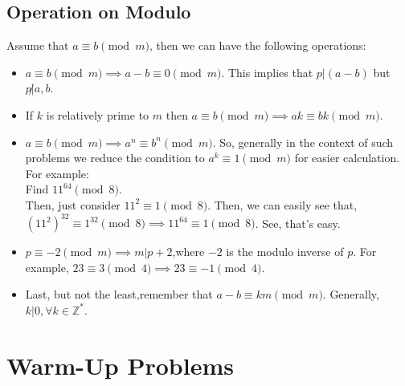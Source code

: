 \documentclass[a4paper,oneside,12 pt]{book}
\theoremstyle{definition}
\theoremstyle{definition}
\theoremstyle{definition}
\begin{document}
\subsection{Operation on Modulo}
Assume that $a \equiv b \pmod{m}$, then we can have the following operations:
\begin{itemize}
\item $a \equiv b \pmod{m} \implies a-b \equiv 0 \pmod{m}$. This implies that $p|(a-b)$ but $p \not |a,b$.
 
\item If $k$ is relatively prime to $m$ then $a \equiv b \pmod{m} \implies ak \equiv bk \pmod{m}$.

\item $a \equiv b \pmod{m} \implies a^n \equiv b^n \pmod{m}$. So, generally in the context of such problems we reduce the condition to $a^k \equiv 1 \pmod{m}$ for easier calculation. For example:\\
Find $11^{64}\pmod{8}$.\\
Then, just consider $11^2 \equiv 1 \pmod{8}$.
Then, we can easily see that, $(11^2)^{32} \equiv 1^{32} \pmod{8} \implies 11^{64} \equiv 1 \pmod{8}$. See, that's easy.
\item $p \equiv -2 \pmod{m} \implies m|p+2$,where $-2$ is the modulo inverse of $p$. For example, $23 \equiv 3 \pmod{4} \implies 23 \equiv -1 \pmod{4} $.

\item Last, but not the least,remember that $a-b \equiv km \pmod {m}$. Generally, $k|0, \forall k \in \mathbb{Z^*}$.
\end{itemize}



\section{Warm-Up Problems}
\end{document}

